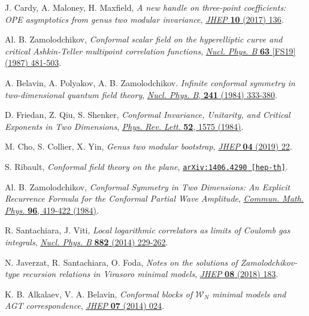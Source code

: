 \documentclass[a4paper,11pt]{article}
\begin{document}
\begin{thebibliography}{99}
 J. Cardy, A. Maloney, H. Maxfield, \emph{A new handle on three-point coefficients: OPE asymptotics from genus
two modular invariance}, \href{https://doi.org/10.1007/JHEP10(2017)136}{\emph{JHEP} {\bf 10} (2017) 136}.

 Al. B. Zamolodchikov, \emph{Conformal scalar field on the hyperelliptic curve and critical Ashkin-Teller multipoint correlation functions}, \href{https://doi.org/10.1016/0550-3213(87)90350-6}{\emph{Nucl. Phys. B} {\bf 63} [FS19] (1987) 481-503}.

 A. Belavin, A. Polyakov, A. B. Zamolodchikov. \emph{Infinite conformal symmetry in two-dimensional quantum field theory},
\href{https://doi.org/10.1016/0550-3213(84)90052-X}{\emph{Nucl. Phys. B}, {\bf 241} (1984) 333-380}.

 D. Friedan, Z. Qiu, S. Shenker, \emph{Conformal Invariance, Unitarity, and Critical Exponents in Two Dimensions}, \href{https://doi.org/10.1103/PhysRevLett.52.1575}{\emph{Phys. Rev. Lett}. {\bf 52}, 1575 (1984)}.

 M. Cho, S. Collier, X. Yin, \emph{Genus two modular bootstrap}, \href{https://doi.org/10.1007/JHEP04(2019)022}{\emph{JHEP} {\bf 04} (2019) 22}.

 S. Ribault, \emph{Conformal field theory on the plane}, \href{https://arxiv.org/abs/1406.4290}{\texttt{arXiv:1406.4290 [hep-th]}}.

 Al.  B.  Zamolodchikov, \emph{Conformal  Symmetry  in  Two  Dimensions: An  Explicit  Recurrence Formula for the  Conformal Partial  Wave  Amplitude}, \href{https://doi.org/10.1007/BF01214585}{\emph{Commun. Math. Phys.} {\bf 96},  419-422  (1984)}.

 R. Santachiara, J. Viti, \emph{Local logarithmic correlators as limits of Coulomb gas integrals},
\href{https://doi.org/10.1016/j.nuclphysb.2014.02.022}{\emph{Nucl. Phys. B} {\bf 882} (2014) 229-262}.

 N. Javerzat, R. Santachiara, O. Foda, \emph{Notes on the solutions of Zamolodchikov-type recursion relations in Virasoro minimal models}, \href{https://doi.org/10.1007/JHEP08(2018)183}{\emph{JHEP} {\bf 08} (2018) 183}.

 K. B. Alkalaev, V. A. Belavin, \emph{Conformal blocks of $\mathcal{W}_N$
minimal models and AGT correspondence}, \href{https://doi.org/10.1007/JHEP07(2014)024}{\emph{JHEP} {\bf 07} (2014) 024}.


\end{thebibliography}
\end{document}
